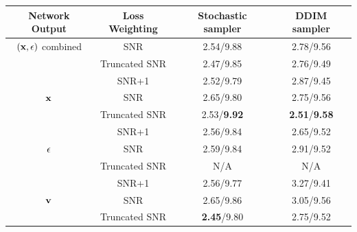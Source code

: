 \documentclass[hidelinks]{article} %
\begin{document}
\begin{table}[hbt]
\begin{center}
\begin{tabular}{cccc}
Network Output & Loss Weighting & Stochastic sampler & DDIM sampler \\ \toprule
$({\mathbf{x}},{\mathbf{\epsilon}})$ combined & SNR                  & 2.54/9.88           & 2.78/9.56 \\
                             & Truncated SNR        & 2.47/9.85           & 2.76/9.49 \\
                             & SNR+1             & 2.52/9.79           & 2.87/9.45 \\ \midrule
${\mathbf{x}}$ & SNR                                        & 2.65/9.80           & 2.75/9.56 \\
       & Truncated SNR                              & 2.53/\textbf{9.92}           & \textbf{2.51}/\textbf{9.58} \\
       & SNR+1                                   & 2.56/9.84           & 2.65/9.52 \\ \midrule
${\mathbf{\epsilon}}$ & SNR                                  & 2.59/9.84           & 2.91/9.52 \\
             & Truncated SNR                        & N/A & N/A \\
             & SNR+1                             & 2.56/9.77           & 3.27/9.41 \\ \midrule
${\mathbf{v}}$ & SNR                                        & 2.65/9.86           & 3.05/9.56 \\
       & Truncated SNR                              & \textbf{2.45}/9.80           & 2.75/9.52 \\

\end{tabular}
\end{center}
\end{table}
\end{document}
